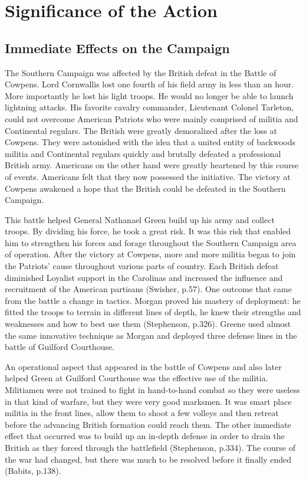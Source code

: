 \section{Significance of the Action}

\subsection{Immediate Effects on the Campaign}

The Southern Campaign was affected by the British defeat in the Battle of Cowpens. Lord Cornwallis lost one fourth of his field army in less than an hour. More importantly he lost his light troops. He would no longer be able to launch lightning attacks. His favorite cavalry commander, Lieutenant Colonel Tarleton, could not overcome American Patriots who were mainly comprised of militia and Continental regulars. The British were greatly demoralized after the loss at Cowpens. They were astonished with the idea that a united entity of backwoods militia and Continental regulars quickly and brutally defeated a professional British army. Americans on the other hand were greatly heartened by this course of events. Americans felt that they now possessed the initiative. The victory at Cowpens awakened a hope that the British could be defeated in the Southern Campaign. 

This battle helped General Nathanael Green build up his army and collect troops. By dividing his force, he took a great risk.  It was this risk that enabled him to strengthen his forces and forage throughout the Southern Campaign area of operation.  After the victory at Cowpens, more and more militia began to join the Patriots’ cause throughout various parts of country.  Each British defeat diminished Loyalist support in the Carolinas and increased the influence and recruitment of the American partisans (Swisher, p.57).  One outcome that came from the battle a change in tactics. Morgan proved his mastery of deployment: he fitted the troops to terrain in different lines of depth, he knew their strengths and weaknesses and how to best use them (Stephenson, p.326).  Greene used almost the same innovative technique as Morgan and deployed three defense lines in the battle of Guilford Courthouse.

An operational aspect that appeared in the battle of Cowpens and also later helped Green at Guilford Courthouse was the effective use of the militia. Militiamen were not trained to fight in hand-to-hand combat so they were useless in that kind of warfare, but they were very good marksmen. It was smart place militia in the front lines, allow them to shoot a few volleys and then retreat before the advancing British formation could reach them. The other immediate effect that occurred was to build up an in-depth defense in order to drain the British as they forced through the battlefield (Stephenson, p.334).  The course of the war had changed, but there was much to be resolved before it finally ended (Babits, p.138). 

